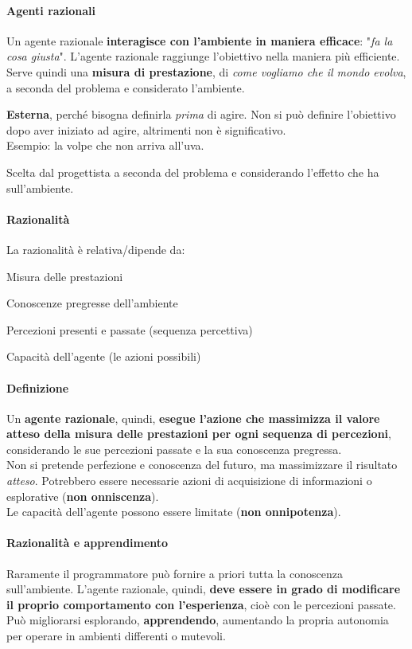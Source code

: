 \documentclass[10pt]{book}
\begin{document}
\paragraph{Agenti razionali} Un agente razionale \textbf{interagisce con l'ambiente in maniera efficace}: "\textit{fa la cosa giusta}". L'agente razionale raggiunge l'obiettivo nella maniera più efficiente.\\
Serve quindi una \textbf{misura di prestazione}, di \textit{come vogliamo che il mondo evolva}, a seconda del problema e considerato l'ambiente.
\begin{list}{}{}
	\item \textbf{Esterna}, perché bisogna definirla \textit{prima} di agire. Non si può definire l'obiettivo dopo aver iniziato ad agire, altrimenti non è significativo.\\
	Esempio: la volpe che non arriva all'uva.
	\item Scelta dal progettista a seconda del problema e considerando l'effetto che ha sull'ambiente.
\end{list}
\paragraph{Razionalità} La razionalità è relativa/dipende da:
\begin{list}{}{}
	\item Misura delle prestazioni
	\item Conoscenze pregresse dell'ambiente
	\item Percezioni presenti e passate (sequenza percettiva)
	\item Capacità dell'agente (le azioni possibili)
\end{list}
\paragraph{Definizione} Un \textbf{agente razionale}, quindi, \textbf{esegue l'azione che massimizza il valore atteso della misura delle prestazioni per ogni sequenza di percezioni}, considerando le sue percezioni passate e la sua conoscenza pregressa.\\
Non si pretende perfezione e conoscenza del futuro, ma massimizzare il risultato \textit{atteso}. Potrebbero essere necessarie azioni di acquisizione di informazioni o esplorative (\textbf{non onniscenza}).\\
Le capacità dell'agente possono essere limitate (\textbf{non onnipotenza}).
\paragraph{Razionalità e apprendimento} Raramente il programmatore può fornire a priori tutta la conoscenza sull'ambiente. L'agente razionale, quindi, \textbf{deve essere in grado di modificare il proprio comportamento con l'esperienza}, cioè con le percezioni passate.\\
Può migliorarsi esplorando, \textbf{apprendendo}, aumentando la propria autonomia per operare in ambienti differenti o mutevoli.
\end{document}
